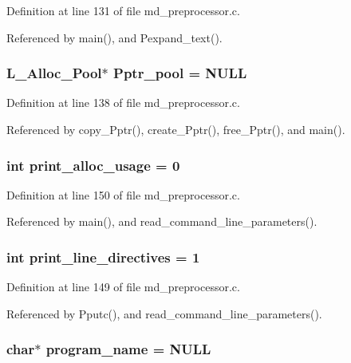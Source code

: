 Definition at line 131 of file md\_\-preprocessor.c.

Referenced by main(), and Pexpand\_\-text().
\subsubsection{\setlength{\rightskip}{0pt plus 5cm}\bf{L\_\-Alloc\_\-Pool}$\ast$ \bf{Pptr\_\-pool} = \bf{NULL}}\label{md__preprocessor_8c_c132912a82b79461cb2c962ae4c525df}




Definition at line 138 of file md\_\-preprocessor.c.

Referenced by copy\_\-Pptr(), create\_\-Pptr(), free\_\-Pptr(), and main().
\subsubsection{\setlength{\rightskip}{0pt plus 5cm}int \bf{print\_\-alloc\_\-usage} = 0}\label{md__preprocessor_8c_bb8d45b771d5af70f76be0bc93f5baae}




Definition at line 150 of file md\_\-preprocessor.c.

Referenced by main(), and read\_\-command\_\-line\_\-parameters().
\subsubsection{\setlength{\rightskip}{0pt plus 5cm}int \bf{print\_\-line\_\-directives} = 1}\label{md__preprocessor_8c_51f80c177dc5130d3f3804774080d22c}




Definition at line 149 of file md\_\-preprocessor.c.

Referenced by Pputc(), and read\_\-command\_\-line\_\-parameters().
\subsubsection{\setlength{\rightskip}{0pt plus 5cm}char$\ast$ \bf{program\_\-name} = \bf{NULL}}\label{md__preprocessor_8c_289c5900d90626d909f0a85d5a0ed61d}




